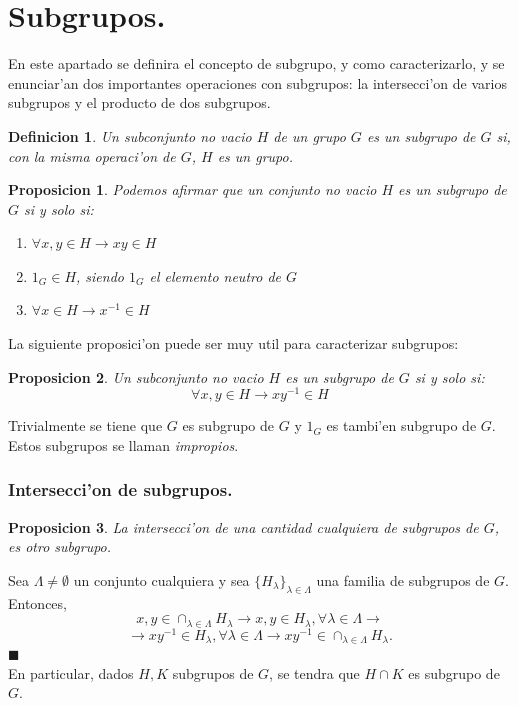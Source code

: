 \documentclass[a4paper,openright,12pt]{book}
\numberwithin{equation}{section} %
\newtheorem{proposicion}{Proposicion}[section] %
\newtheorem{definicion}{Definicion}[section] %
\newenvironment{proof}{\noindent{\it Demostracion:}}{\hfill$\blacksquare$} %
\begin{document}
\section{Subgrupos.}
En este apartado se definira el concepto de subgrupo, y como caracterizarlo,  y se enunciar'an dos importantes operaciones con subgrupos: la intersecci'on de varios subgrupos y el producto de dos subgrupos.
\begin{definicion}
Un subconjunto no vacio $H$ de un grupo $G$ es un subgrupo de $G$ si, con la misma operaci'on de $G$, $H$ es un grupo.
\end{definicion}
\begin{proposicion}
Podemos afirmar que un conjunto no vacio $H$ es un subgrupo de $G$ si y solo si:
\begin{enumerate}
\item $\forall x,y \in H \rightarrow xy \in H$
\item $1_{G}\in H$, siendo $1_{G}$ el elemento neutro de $G$
\item $\forall x \in H \rightarrow x^{-1} \in H$
\end{enumerate}
\end{proposicion}
La siguiente proposici'on puede ser muy util para caracterizar subgrupos:
\begin{proposicion}
Un subconjunto no vacio $H$ es un subgrupo de $G$ si y solo si:
\[
\forall x,y \in H \rightarrow xy^{-1}\in H
\]
\end{proposicion}
Trivialmente se tiene que $G$ es subgrupo de $G$ y $1_{G}$ es tambi'en subgrupo de $G$. Estos subgrupos se llaman \textit{impropios}.
\subsubsection{Intersecci'on de subgrupos.}
\begin{proposicion}
La intersecci'on de una cantidad cualquiera de subgrupos de $G$, es otro subgrupo.
\end{proposicion}
\begin{proof}
Sea $\Lambda \neq \emptyset$ un conjunto cualquiera y sea $\{H_{\lambda} \}_{\lambda \in \Lambda}$ una familia de subgrupos de $G$. Entonces,
\[
x,y \in \cap_{\lambda \in \Lambda}H_{\lambda}\rightarrow x,y \in H_{\lambda},\forall \lambda \in \Lambda \rightarrow
\]
\[
\rightarrow xy^{-1}\in H_{\lambda}, \forall \lambda \in \Lambda \rightarrow xy^{-1} \in \cap _{\lambda \in \Lambda}H_{\lambda}.
\]
\end{proof}
\\
En particular, dados $H,K$ subgrupos de $G$, se tendra que $H \cap K$ es subgrupo de $G$.
\end{document}
